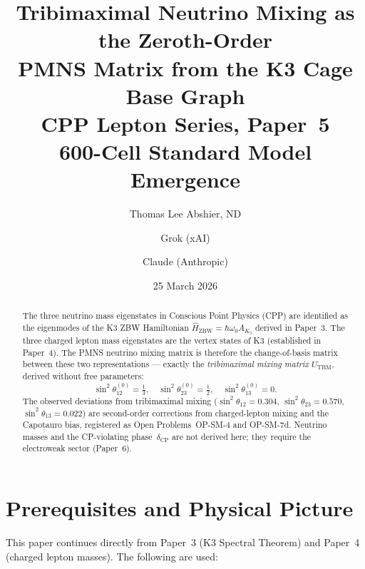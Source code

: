 \documentclass[11pt]{article}
\title{\textbf{Tribimaximal Neutrino Mixing as the Zeroth-Order\\
PMNS Matrix from the K3 Cage Base Graph}\\[6pt]
\large CPP Lepton Series, Paper~5\\[4pt]
\normalsize 600-Cell Standard Model Emergence}
\author{Thomas Lee Abshier, ND \and Grok (xAI) \and Claude (Anthropic)}
\date{25 March 2026}
\newcommand{\ZBW}{\mathrm{ZBW}}
\newcommand{\CP}{\mathrm{CP}}
\newcommand{\TBM}{\mathrm{TBM}}
\begin{document}
\maketitle

\begin{abstract}
The three neutrino mass eigenstates in Conscious Point Physics (CPP)
are identified as the eigenmodes of the K3 ZBW Hamiltonian
$\hat{H}_\ZBW = \hbar\omega_0 A_{K_3}$ derived in Paper~3.  The
three charged lepton mass eigenstates are the vertex states of K3
(established in Paper~4).  The PMNS neutrino mixing matrix is
therefore the change-of-basis matrix between these two representations
--- exactly the \emph{tribimaximal mixing matrix} $U_\TBM$, derived
without free parameters:
\[
\sin^2\theta_{12}^{(0)} = \tfrac{1}{3},\quad
\sin^2\theta_{23}^{(0)} = \tfrac{1}{2},\quad
\sin^2\theta_{13}^{(0)} = 0.
\]
The observed deviations from tribimaximal mixing
($\sin^2\theta_{12} = 0.304$, $\sin^2\theta_{23} = 0.570$,
$\sin^2\theta_{13} = 0.022$) are second-order corrections from
charged-lepton mixing and the Capotauro bias, registered as
Open Problems~OP-SM-4 and OP-SM-7d.
Neutrino masses and the CP-violating phase~$\delta_\CP$ are not
derived here; they require the electroweak sector (Paper~6).
\end{abstract}

\section{Prerequisites and Physical Picture}

This paper continues directly from Paper~3 (K3 Spectral Theorem)
and Paper~4 (charged lepton masses). The following are used:
\end{document}
